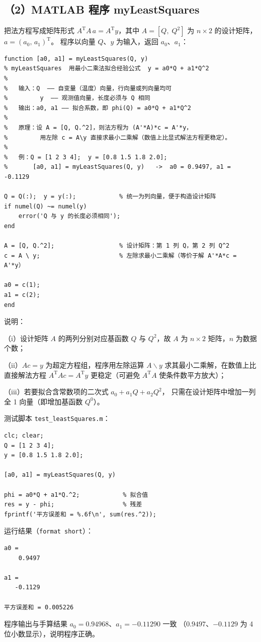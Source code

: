 \documentclass[a4paper,11pt]{ctexart}
\begin{document}
\subsection*{（2）MATLAB 程序 myLeastSquares}
把法方程写成矩阵形式 $A^{\mathrm{T}}A\,a=A^{\mathrm{T}}y$，其中
$A=[Q,\;Q^{2}]$ 为 $n\times2$ 的设计矩阵，$a=(a_0,\,a_1)^{\mathrm{T}}$。
程序以向量 $Q$、$y$ 为输入，返回 $a_0$、$a_1$：

\begin{minipage}{\linewidth}
\begin{lstlisting}
function [a0, a1] = myLeastSquares(Q, y)
% myLeastSquares  用最小二乘法拟合经验公式  y = a0*Q + a1*Q^2
%
%   输入：Q  —— 自变量（温度）向量，行向量或列向量均可
%         y  —— 观测值向量，长度必须与 Q 相同
%   输出：a0, a1 —— 拟合系数，即 phi(Q) = a0*Q + a1*Q^2
%
%   原理：设 A = [Q, Q.^2]，则法方程为 (A'*A)*c = A'*y，
%         用左除 c = A\y 直接求最小二乘解（数值上比显式解法方程更稳定）。
%
%   例：Q = [1 2 3 4];  y = [0.8 1.5 1.8 2.0];
%       [a0, a1] = myLeastSquares(Q, y)   ->  a0 = 0.9497, a1 = -0.1129

Q = Q(:);  y = y(:);            % 统一为列向量，便于构造设计矩阵
if numel(Q) ~= numel(y)
    error('Q 与 y 的长度必须相同');
end

A = [Q, Q.^2];                  % 设计矩阵：第 1 列 Q，第 2 列 Q^2
c = A \ y;                      % 左除求最小二乘解（等价于解 A'*A*c = A'*y）

a0 = c(1);
a1 = c(2);
end
\end{lstlisting}
\end{minipage}

说明：

\hspace{1.2em}（i）设计矩阵 $A$ 的两列分别对应基函数 $Q$ 与 $Q^{2}$，故 $A$ 为
$n\times2$ 矩阵，$n$ 为数据个数；

\hspace{1.2em}（ii）$Ac=y$ 为超定方程组，程序用左除运算 $A\backslash y$
求其最小二乘解，在数值上比直接解法方程
$A^{\mathrm{T}}Ac=A^{\mathrm{T}}y$ 更稳定（可避免 $A^{\mathrm{T}}A$
使条件数平方放大）；

\hspace{1.2em}（iii）若要拟合含常数项的二次式 $a_0+a_1Q+a_2Q^{2}$，
只需在设计矩阵中增加一列全 1 向量（即增加基函数 $Q^{0}$）。

\noindent\begin{minipage}{\linewidth}
测试脚本 \texttt{test\_leastSquares.m}：

\begin{lstlisting}
clc; clear;
Q = [1 2 3 4];
y = [0.8 1.5 1.8 2.0];

[a0, a1] = myLeastSquares(Q, y)

phi = a0*Q + a1*Q.^2;            % 拟合值
res = y - phi;                   % 残差
fprintf('平方误差和 = %.6f\n', sum(res.^2));
\end{lstlisting}
\end{minipage}

\noindent\begin{minipage}{\linewidth}
运行结果（\texttt{format short}）：

\begin{lstlisting}[numbers=none,language={}]
a0 =
    0.9497

a1 =
   -0.1129

平方误差和 = 0.005226
\end{lstlisting}
\end{minipage}

程序输出与手算结果 $a_0=0.94968$、$a_1=-0.11290$ 一致
（$0.9497$、$-0.1129$ 为 4 位小数显示），说明程序正确。
\end{document}

